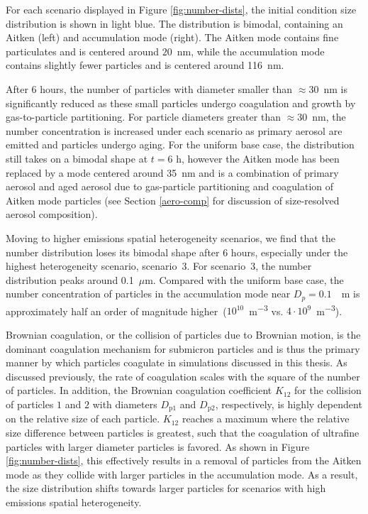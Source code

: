 For each scenario displayed in Figure \ref{fig:number-dists}, the initial condition size distribution is shown in light blue. The distribution is bimodal, containing an Aitken (left) and accumulation mode (right). The Aitken mode contains fine particulates and is centered around $20$~nm, while the accumulation mode contains slightly fewer particles and is centered around 116~nm. 

After 6 hours, the number of particles with diameter smaller than $\approx30$~nm is significantly reduced as these small particles undergo coagulation and growth by gas-to-particle partitioning. For particle diameters greater than $\approx30$~nm, the number concentration is increased under each scenario as primary aerosol are emitted and particles undergo aging. For the uniform base case, the distribution still takes on a bimodal shape at $t=6$ h, however the Aitken mode has been replaced by a mode centered around 35~nm and is a combination of primary aerosol and aged aerosol due to gas-particle partitioning and coagulation of Aitken mode particles (see Section \ref{aero-comp} for discussion of size-resolved aerosol composition). 

Moving to higher emissions spatial heterogeneity scenarios, we find that the number distribution loses its bimodal shape after 6 hours, especially under the highest heterogeneity scenario, scenario~3. For scenario~3, the number distribution peaks around 0.1~$\mu$m. Compared with the uniform base case, the number concentration of particles in the accumulation mode near $D_p = 0.1$~\si{\mu m} is approximately half an order of magnitude higher~($10^{10}$~\si{m^{-3}} vs. $4\cdot10^9$~\si{m^{-3}}).

Brownian coagulation, or the collision of particles due to Brownian motion, is the dominant coagulation mechanism for submicron particles and is thus the primary manner by which particles coagulate in simulations discussed in this thesis.  As discussed previously, the rate of coagulation scales with the square of the number of particles. In addition, the Brownian coagulation coefficient $K_{12}$ for the collision of particles $1$ and $2$ with diameters $D_{\text{p}1}$ and $D_{\text{p}2}$, respectively, is highly dependent on the relative size of each particle. $K_{12}$ reaches a maximum where the relative size difference between particles is greatest, such that the coagulation of ultrafine particles with larger diameter particles is favored. As shown in Figure \ref{fig:number-dists}, this effectively results in a removal of particles from the Aitken mode as they collide with larger particles in the accumulation mode. As a result, the size distribution shifts towards larger particles for scenarios with high emissions spatial heterogeneity.

